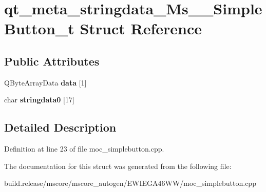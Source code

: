 \hypertarget{structqt__meta__stringdata___ms_____simple_button__t}{}\section{qt\+\_\+meta\+\_\+stringdata\+\_\+\+Ms\+\_\+\+\_\+\+Simple\+Button\+\_\+t Struct Reference}
\label{structqt__meta__stringdata___ms_____simple_button__t}
\subsection*{Public Attributes}
\begin{DoxyCompactItemize}
\item 
\mbox{\label{structqt__meta__stringdata___ms_____simple_button__t_aef568b500545fae86ebc018045d12879}} 
Q\+Byte\+Array\+Data {\bfseries data} \mbox{[}1\mbox{]}
\item 
\mbox{\label{structqt__meta__stringdata___ms_____simple_button__t_a74d009f5b288fcb5236e1a8793355463}} 
char {\bfseries stringdata0} \mbox{[}17\mbox{]}
\end{DoxyCompactItemize}


\subsection{Detailed Description}


Definition at line 23 of file moc\+\_\+simplebutton.\+cpp.



The documentation for this struct was generated from the following file\+:\begin{DoxyCompactItemize}
\item 
build.\+release/mscore/mscore\+\_\+autogen/\+E\+W\+I\+E\+G\+A46\+W\+W/moc\+\_\+simplebutton.\+cpp\end{DoxyCompactItemize}
